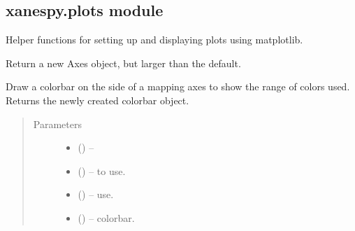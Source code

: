 \documentclass[letterpaper,10pt,english]{sphinxmanual}
\begin{document}
\subsection{xanespy.plots module}
\label{\detokenize{xanespy:xanespy-plots-module}}\label{\detokenize{xanespy:module-xanespy.plots}}
Helper functions for setting up and displaying plots using matplotlib.

\begin{fulllineitems}
\label{\detokenize{xanespy:xanespy.plots.big_axes}}
Return a new Axes object, but larger than the default.

\end{fulllineitems}


\begin{fulllineitems}
\label{\detokenize{xanespy:xanespy.plots.draw_colorbar}}
Draw a colorbar on the side of a mapping axes to show the range of
colors used. Returns the newly created colorbar object.
\begin{quote}\begin{description}
\item[{Parameters}] \leavevmode\begin{itemize}
\item {} 
 (\sphinxstyleliteralemphasis{-}) -- 

\item {} 
 (\sphinxstyleliteralemphasis{-}) -- to use.

\item {} 
 (\sphinxstyleliteralemphasis{-}) -- use.

\item {} 
 (\sphinxstyleliteralemphasis{-}) -- colorbar.

\end{itemize}

\end{description}\end{quote}

\end{fulllineitems}
\end{document}
